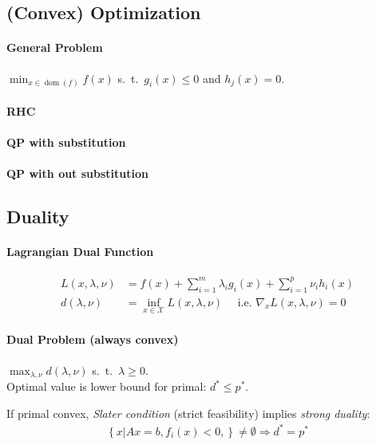 \documentclass[landscape,a4paper,8pt]{scrartcl}
\newcommand{\mc}[1]{\mathcal{#1}}
\DeclareMathOperator\dom{dom}
\begin{document}
\begin{multicols*}{3}
\section{(Convex) Optimization}

\paragraph{General Problem}
$\min_{x \in \dom(f)} f(x)$ s.\ t.\ $g_i(x) \leq 0$ and $h_j(x) = 0.$

\paragraph{RHC}
\paragraph{QP with substitution}
\paragraph{QP with out substitution}

\subsection{Duality}
\paragraph{Lagrangian Dual Function}
\begin{align*}
	L(x,\lambda,\nu) & = f(x) + \sum_{i=1}^{m}\lambda_i g_i(x) + \sum_{i=1}^{p}\nu_i h_i(x) \\
	d(\lambda,\nu) & = \inf_{x \in \mc{X}} L(x,\lambda,\nu) \quad \text{ i.e. } \nabla_x L(x, \lambda, \nu) = 0
\end{align*}
\paragraph{Dual Problem (always convex)} 
$\max_{\lambda,\nu} d(\lambda,\nu)$ s.\ t.\ $\lambda \geq 0$. \\
Optimal value is lower bound for primal: $d^* \leq p^*$.

If primal convex, \emph{Slater condition} (strict feasibility) implies \emph{strong duality}:
\begin{align*}
	\left\{x \left| \right. Ax=b, f_i(x)<0, \right\} \neq \emptyset \Rightarrow d^*  = p^*
\end{align*}


\end{multicols*}
\end{document}
